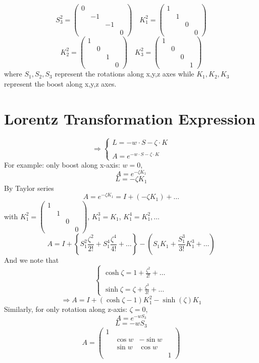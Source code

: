 \documentclass{article}
\begin{document}
	\[ S_3^2 = \begin{pmatrix}
		0 & & & \\
		& -1 & & \\
		& & -1 & \\
		& & & 0
	\end{pmatrix}
	\quad
	K_1^2 = \begin{pmatrix}
		1 & & & \\
		& 1 & & \\
		& & 0 & \\
		& & & 0
	\end{pmatrix}
	\]
	\[ K_2^2 = \begin{pmatrix}
		1 & & & \\
		& 0 & & \\
		& & 1 & \\
		& & & 0
	\end{pmatrix}
	\quad
	K_3^2 = \begin{pmatrix}
		1 & & & \\
		& 0 & & \\
		& & 0 & \\
		& & & 1
	\end{pmatrix}
	\]
	where $S_1, S_2, S_3$ represent the rotations along x,y,z axes while $K_1, K_2, K_3$ represent the boost along x,y,z axes.
	
	\section*{Lorentz Transformation Expression}
	\[
	\Rightarrow
	\begin{cases}
		L = -w \cdot S - \zeta \cdot K \\
		\\
		A = e^{-w \cdot S - \zeta \cdot K}
	\end{cases}
	\]
	For example: only boost along x-axis: $w=0$,
	\[ A = e^{-\zeta K_1} \]
	\[ L = -\zeta K_1 \]
	By Taylor series
	\[ A = e^{-\zeta K_1} = I + (-\zeta K_1) + \dots \]
	with $K_1^2 = \begin{pmatrix} 1 & & \\ & 1 & & \\ & & 0 & \\ & & & 0 \end{pmatrix}$, $K_1^3 = K_1$, $K_1^4 = K_1^2, \dots$
	\[ A = I + \left\{ S_1^2 \frac{\zeta^2}{2!} + S_1^4 \frac{\zeta^4}{4!} + \dots \right\} - \left( S_1 K_1 + \frac{S_1^3}{3!} K_1^3 + \dots \right) \]
	And we note that
	\[
	\begin{cases}
		\cosh \zeta = 1 + \frac{\zeta^2}{2!} + \dots \\
		\\
		\sinh \zeta = \zeta + \frac{\zeta^3}{3!} + \dots
	\end{cases}
	\]
	\[ \Rightarrow A = I + (\cosh\zeta - 1)K_1^2 - \sinh(\zeta)K_1 \]
	Similarly, for only rotation along z-axis: $\zeta=0$,
	\[ A = e^{-w S_3} \]
	\[ L = -w S_3 \]
	\[ A =
	\begin{pmatrix}
		1 & & & \\
		& \cos w & -\sin w & \\
		& \sin w & \cos w & \\
		& & & 1
	\end{pmatrix}
	\]
\end{document}
